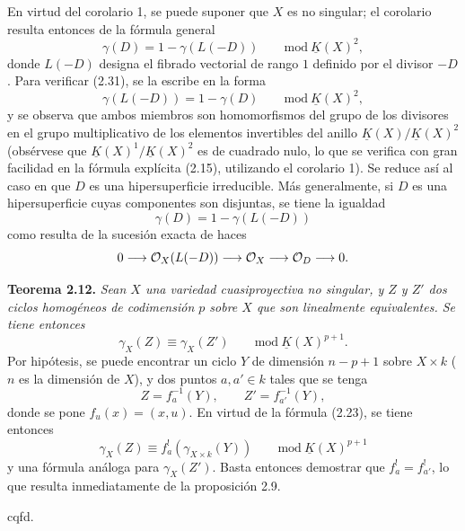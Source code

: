 En virtud del corolario 1, se puede suponer que $X$ es no singular; el corolario resulta entonces de la fórmula general
\begin{equation}\tag{2.31}
 \gamma(D)=1-\gamma(L(-D))\qquad\mathrm{mod}\ \underline K(X)^2,
\end{equation}
donde $L(-D)$ designa el fibrado vectorial de rango $1$ definido por el divisor $-D$. Para verificar (2.31), se la escribe en la forma
\begin{equation}\tag{2.31 bis}
 \gamma(L(-D))=1-\gamma(D)\qquad\mathrm{mod}\ \underline K(X)^2,
\end{equation}
y se observa que ambos miembros son homomorfismos del grupo de los divisores en el grupo multiplicativo de los elementos invertibles del anillo $\underline K(X)/\underline K(X)^2$ (obsérvese que $\underline K(X)^1/\underline K(X)^2$ es de cuadrado nulo, lo que se verifica con gran facilidad en la fórmula explícita (2.15), utilizando el corolario 1). Se reduce así al caso en que $D$ es una hipersuperficie irreducible. Más generalmente, si $D$ es una hipersuperficie cuyas componentes son disjuntas, se tiene la igualdad
\begin{equation}\tag{2.32}
 \gamma(D)=1-\gamma(L(-D))
\end{equation}
como resulta de la sucesión exacta de haces
\[
0\longrightarrow\mathcal O_X(L(-D))\longrightarrow\mathcal O_X\longrightarrow\mathcal O_D\longrightarrow0.
\]

\textbf{Teorema 2.12.} \emph{Sean $X$ una variedad cuasiproyectiva no singular, y $Z$ y $Z'$ dos ciclos homogéneos de codimensión $p$ sobre $X$ que son linealmente equivalentes. Se tiene entonces}
\begin{equation}\tag{2.33}
 \gamma_X(Z)\equiv\gamma_X(Z')\qquad\mathrm{mod}\ \underline K(X)^{p+1}.
\end{equation}
Por hipótesis, se puede encontrar un ciclo $Y$ de dimensión $n-p+1$ sobre $X\times k$ ($n$ es la dimensión de $X$), y dos puntos $a,a'\in k$ tales que se tenga
\[
 Z=f_a^{-1}(Y),\qquad Z'=f_{a'}^{-1}(Y),
\]
donde se pone $f_u(x)=(x,u)$. En virtud de la fórmula (2.23), se tiene entonces
\[
 \gamma_X(Z)\equiv f_a^!(\gamma_{X\times k}(Y))\qquad\mathrm{mod}\ \underline K(X)^{p+1}
\]
y una fórmula análoga para $\gamma_X(Z')$. Basta entonces demostrar que $f_a^!=f_{a'}^!$, lo que resulta inmediatamente de la proposición 2.9.
\begin{flushright}cqfd.\end{flushright}

